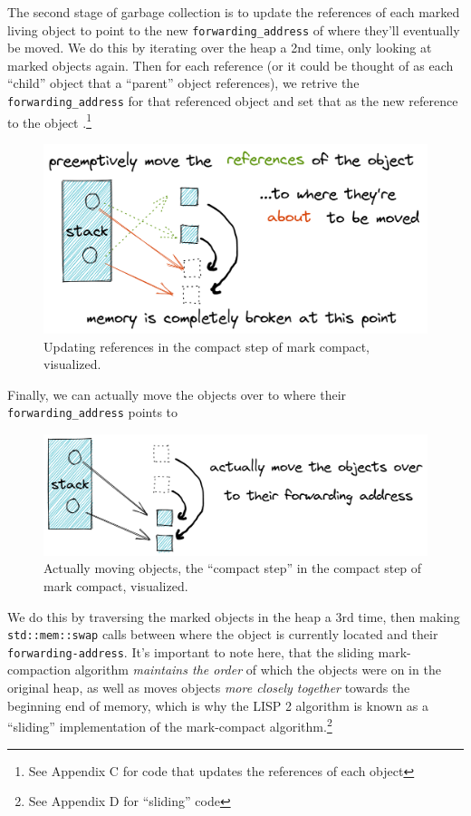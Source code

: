 \documentclass[index]{subfiles}
\begin{document}
The second stage of garbage collection is to update the references of each marked living object to point to the new \verb+forwarding_address+ of where they'll eventually be moved. We do this by iterating over the heap a 2nd time, only looking at marked objects again. Then for each reference (or it could be thought of as each ``child'' object that a ``parent'' object references), we retrive the \verb+forwarding_address+ for that referenced object and set that as the new reference to the object \cites[Chapter 3]{gc_handbook}[Sec.~3.4]{redhat_openjdk}.\footnote{See Appendix C for code that updates the references of each object}

\begin{figure}[H]
    \centering
    \includegraphics[scale=0.3]{pics/update-references.png}
    \caption{Updating references in the compact step of mark compact, visualized.}
\end{figure}

Finally, we can actually move the objects over to where their \verb+forwarding_address+ points to

\begin{figure}[H]
    \centering
    \includegraphics[scale=0.25]{pics/actually-move.png}
    \caption{Actually moving objects, the ``compact step'' in the compact step of mark compact, visualized.}
\end{figure}

We do this by traversing the marked objects in the heap a 3rd time, then making \texttt{std::mem::swap} calls between where the object is currently located and their \verb+forwarding-address+. It's important to note here, that the sliding mark-compaction algorithm \textit{maintains the order} of which the objects were on in the original heap, as well as moves objects \textit{more closely together} towards the beginning end of memory, which is why the LISP 2 algorithm is known as a ``sliding'' implementation of the mark-compact algorithm.\footnote{See Appendix D for ``sliding'' code}
\end{document}
